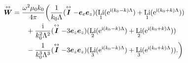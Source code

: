 \documentclass[hyperref, a4paper]{article}
\newcommand*{\ii}{\mathrm{i}}
\newcommand*{\ee}{\mathrm{e}}
\DeclareMathOperator{\li}{Li}
\renewcommand{\tensor}[1]{ \stackrel{\leftrightarrow}{\vb*{#1}}}
\begin{document}
\begin{equation}
    \begin{aligned}
        \tensor{\vb*{W}} &= \frac{\omega^2 \mu_0 k_0}{4 \pi} \biggl(
        \frac{1}{k_0 \Lambda} (\tensor{\vb*{I}} - \vb*{e}_e \vb*{e}_z) (\li_1(\ee^{\ii (k_0 - k) \Lambda}) + \li_1(\ee^{\ii (k_0 + k) \Lambda})) \\
        &\quad \quad + \frac{\ii}{k_0^2 \Lambda^2} (\tensor{\vb*{I}} - 3 \vb*{e}_z \vb*{e}_z) (\li_2(\ee^{\ii (k_0 - k) \Lambda}) + \li_2(\ee^{\ii (k_0 + k) \Lambda})) \\
        &\quad \quad - \frac{1}{k_0^3 \Lambda^3} (\tensor{\vb*{I}} - 3 \vb*{e}_z \vb*{e}_z) (\li_3(\ee^{\ii (k_0 - k) \Lambda}) + \li_3(\ee^{\ii (k_0 + k) \Lambda})).
        \biggr)
    \end{aligned}
    \label{eq:w-explicit}
\end{equation}
\end{document}
